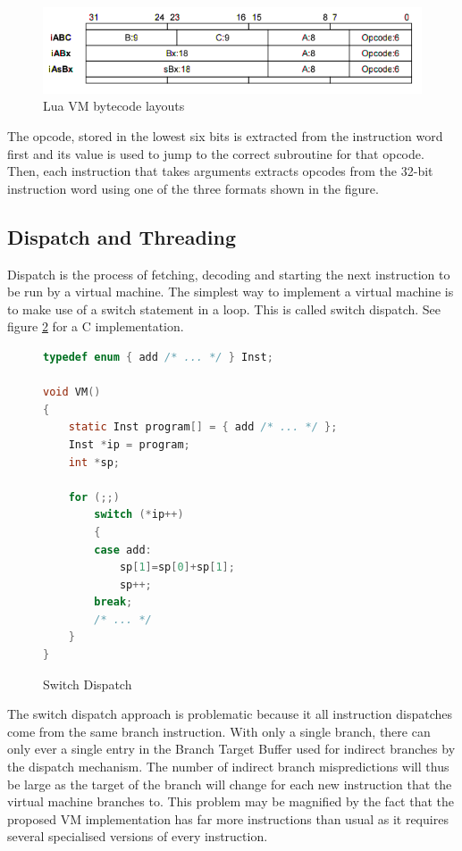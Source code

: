 \documentclass[english,a4paper,12pt]{report}
\begin{document}
\begin{figure}[!htb]
	\begin{center}
	    \includegraphics[scale=0.5]{luabytecode.png}
	\end{center}
 
  \caption[Lua VM bytecode layouts]{Lua VM bytecode layouts
    \protect\cite{RobertoIerusalimschy}}
  \label{fig:luabyte-repeat}
\end{figure}

The opcode, stored in the lowest six bits is extracted from the
instruction word first \cite{Lua.Source} and its value is used to jump
to the correct subroutine for that opcode. Then, each instruction that
takes arguments extracts opcodes from the 32-bit instruction word
using one of the three formats shown in the figure.

\subsection{Dispatch and Threading}
\label{sec:dispatch}
Dispatch is the process of fetching, decoding and starting the next
instruction to be run by a virtual machine. The simplest way to
implement a virtual machine is to make use of a switch statement in a
loop. This is called switch dispatch. See figure \ref{fig:switch} for
a C implementation.

\begin{figure}[!htb]
  \begin{lstlisting}[language=C]
typedef enum { add /* ... */ } Inst; 

void VM() 
{ 
    static Inst program[] = { add /* ... */ }; 
    Inst *ip = program; 
    int *sp; 

    for (;;) 
        switch (*ip++) 
        { 
        case add: 
            sp[1]=sp[0]+sp[1]; 
            sp++; 
        break; 
        /* ... */ 
    }
} 
  \end{lstlisting}
  \caption[Switch Dispatch]{Switch Dispatch\cite{Ertl}}
  \label{fig:switch}
\end{figure}

The switch dispatch approach is problematic because it all instruction
dispatches come from the same branch instruction. With only a single
branch, there can only ever a single entry in the Branch Target Buffer
used for indirect branches by the dispatch mechanism. The number of
indirect branch mispredictions will thus be large as the target of the
branch will change for each new instruction that the virtual machine
branches to. This problem may be magnified by the fact that the
proposed VM implementation has far more instructions than usual as it
requires several specialised versions of every instruction.
\end{document}
